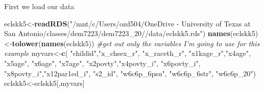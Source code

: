 \documentclass[
]{article}
\newenvironment{Shaded}{\begin{snugshade}}{\end{snugshade}}
\newcommand{\CommentTok}[1]{\textcolor[rgb]{0.56,0.35,0.01}{\textit{#1}}}
\newcommand{\KeywordTok}[1]{\textcolor[rgb]{0.13,0.29,0.53}{\textbf{#1}}}
\newcommand{\NormalTok}[1]{#1}
\newcommand{\StringTok}[1]{\textcolor[rgb]{0.31,0.60,0.02}{#1}}
\begin{document}
First we load our data

\begin{Shaded}
\begin{Highlighting}[]
\NormalTok{eclskk5<-}\KeywordTok{readRDS}\NormalTok{(}\StringTok{"/mnt/c/Users/ozd504/OneDrive - University of Texas at San Antonio/classes/dem7223/dem7223_20//data/eclskk5.rds"}\NormalTok{)}
\KeywordTok{names}\NormalTok{(eclskk5)<-}\KeywordTok{tolower}\NormalTok{(}\KeywordTok{names}\NormalTok{(eclskk5))}
\CommentTok{#get out only the variables I'm going to use for this example}
\NormalTok{myvars<-}\KeywordTok{c}\NormalTok{( }\StringTok{"childid"}\NormalTok{,}\StringTok{"x_chsex_r"}\NormalTok{, }\StringTok{"x_raceth_r"}\NormalTok{, }\StringTok{"x1kage_r"}\NormalTok{,}\StringTok{"x4age"}\NormalTok{, }\StringTok{"x5age"}\NormalTok{, }\StringTok{"x6age"}\NormalTok{, }\StringTok{"x7age"}\NormalTok{, }\StringTok{"x2povty"}\NormalTok{,}\StringTok{"x4povty_i"}\NormalTok{, }\StringTok{"x6povty_i"}\NormalTok{, }\StringTok{"x8povty_i"}\NormalTok{,}\StringTok{"x12par1ed_i"}\NormalTok{, }\StringTok{"s2_id"}\NormalTok{, }\StringTok{"w6c6p_6psu"}\NormalTok{, }\StringTok{"w6c6p_6str"}\NormalTok{, }\StringTok{"w6c6p_20"}\NormalTok{)}
\NormalTok{eclskk5<-eclskk5[,myvars]}
\end{Highlighting}
\end{Shaded}
\end{document}
